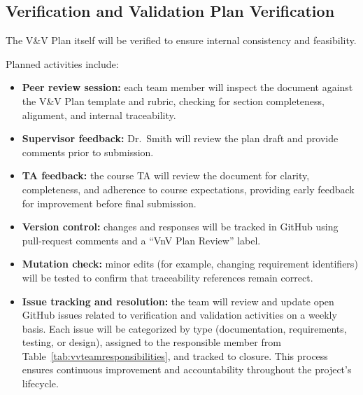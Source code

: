 \documentclass[12pt, titlepage]{article}
\begin{document}
\subsection{Verification and Validation Plan Verification}
\label{subsec:vnv-plan-verification}

The V\&V Plan itself will be verified to ensure internal consistency and
feasibility.

Planned activities include:

\begin{itemize}
  \item \textbf{Peer review session:} each team member will inspect the document
  against the V\&V Plan template and rubric, checking for section completeness,
  alignment, and internal traceability.

  \item \textbf{Supervisor feedback:} Dr.~Smith will review the plan draft and
  provide comments prior to submission.

  \item \textbf{TA feedback:} the course TA will review the document for clarity,
  completeness, and adherence to course expectations, providing early feedback
  for improvement before final submission.

  \item \textbf{Version control:} changes and responses will be tracked in
  GitHub using pull-request comments and a ``VnV Plan Review'' label.

  \item \textbf{Mutation check:} minor edits (for example, changing requirement
  identifiers) will be tested to confirm that traceability references remain
  correct.

  \item \textbf{Issue tracking and resolution:} the team will review and update
  open GitHub issues related to verification and validation activities on a
  weekly basis. Each issue will be categorized by type (documentation,
  requirements, testing, or design), assigned to the responsible member from
  Table~\ref{tab:vvteamresponsibilities}, and tracked to closure. This process
  ensures continuous improvement and accountability throughout the project’s
  lifecycle.
\end{itemize}
\end{document}
